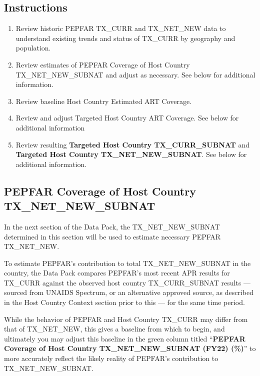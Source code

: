 \documentclass[
  openany]{book}
\begin{document}
\hypertarget{instructions-2}{%
\subsection{Instructions}\label{instructions-2}}

\begin{enumerate}
\def\labelenumi{\arabic{enumi}.}
\item
  Review historic PEPFAR TX\_CURR and TX\_NET\_NEW data to understand
  existing trends and status of TX\_CURR by geography and population.
\item
  Review estimates of PEPFAR Coverage of Host Country
  TX\_NET\_NEW\_SUBNAT and adjust as necessary. See below for additional
  information.
\item
  Review baseline Host Country Estimated ART Coverage.
\item
  Review and adjust Targeted Host Country ART Coverage. See below for
  additional information
\item
  Review resulting \textbf{Targeted Host Country TX\_CURR\_SUBNAT} and
  \textbf{Targeted Host Country TX\_NET\_NEW\_SUBNAT}. See below for
  additional information.
\end{enumerate}

\hypertarget{pepfar-coverage-of-host-country-tx_net_new_subnat}{%
\subsection{PEPFAR Coverage of Host Country TX\_NET\_NEW\_SUBNAT}\label{pepfar-coverage-of-host-country-tx_net_new_subnat}}

In the next section of the Data Pack, the TX\_NET\_NEW\_SUBNAT determined
in this section will be used to estimate necessary PEPFAR TX\_NET\_NEW.

To estimate PEPFAR's contribution to total TX\_NET\_NEW\_SUBNAT in the
country, the Data Pack compares PEPFAR's most recent APR results for
TX\_CURR against the observed host country TX\_CURR\_SUBNAT results ---
sourced from UNAIDS Spectrum, or an alternative approved source, as
described in the Host Country Context section prior to this --- for the
same time period.

While the behavior of PEPFAR and Host Country TX\_CURR may differ from
that of TX\_NET\_NEW, this gives a baseline from which to begin, and
ultimately you may adjust this baseline in the green column titled
``\textbf{PEPFAR Coverage of Host Country TX\_NET\_NEW\_SUBNAT (FY22) (\%)}'' to
more accurately reflect the likely reality of PEPFAR's contribution to
TX\_NET\_NEW\_SUBNAT.
\end{document}
